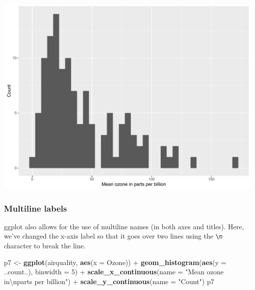 \documentclass[]{article}
\newenvironment{Shaded}{\begin{snugshade}}{\end{snugshade}}
\newcommand{\KeywordTok}[1]{\textcolor[rgb]{0.13,0.29,0.53}{\textbf{{#1}}}}
\newcommand{\DataTypeTok}[1]{\textcolor[rgb]{0.13,0.29,0.53}{{#1}}}
\newcommand{\DecValTok}[1]{\textcolor[rgb]{0.00,0.00,0.81}{{#1}}}
\newcommand{\CharTok}[1]{\textcolor[rgb]{0.31,0.60,0.02}{{#1}}}
\newcommand{\StringTok}[1]{\textcolor[rgb]{0.31,0.60,0.02}{{#1}}}
\newcommand{\NormalTok}[1]{{#1}}
\begin{document}
\begin{center}\includegraphics{0_all_posts_pdf/histogram_5-1} \end{center}

\subsubsection{Multiline labels}\label{multiline-labels}

ggplot also allows for the use of multiline names (in both axes and
titles). Here, we've changed the x-axis label so that it goes over two
lines using the \texttt{\textbackslash{}n} character to break the line.

\begin{Shaded}
\begin{Highlighting}[]
\NormalTok{p7 <-}\StringTok{ }\KeywordTok{ggplot}\NormalTok{(airquality, }\KeywordTok{aes}\NormalTok{(}\DataTypeTok{x =} \NormalTok{Ozone)) +}\StringTok{ }
\StringTok{      }\KeywordTok{geom_histogram}\NormalTok{(}\KeywordTok{aes}\NormalTok{(}\DataTypeTok{y =} \NormalTok{..count..), }\DataTypeTok{binwidth =} \DecValTok{5}\NormalTok{) +}
\StringTok{      }\KeywordTok{scale_x_continuous}\NormalTok{(}\DataTypeTok{name =} \StringTok{"Mean ozone in}\CharTok{\textbackslash{}n}\StringTok{parts per billion"}\NormalTok{) +}
\StringTok{      }\KeywordTok{scale_y_continuous}\NormalTok{(}\DataTypeTok{name =} \StringTok{"Count"}\NormalTok{)}
\NormalTok{p7}
\end{Highlighting}
\end{Shaded}
\end{document}
